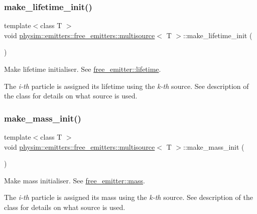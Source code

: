 \subsubsection{\texorpdfstring{make\+\_\+lifetime\+\_\+init()}{make\_lifetime\_init()}}
{\footnotesize\ttfamily template$<$class T $>$ \\
void \hyperlink{classphysim_1_1emitters_1_1free__emitters_1_1multisource}{physim\+::emitters\+::free\+\_\+emitters\+::multisource}$<$ T $>$\+::make\+\_\+lifetime\+\_\+init (\begin{DoxyParamCaption}{ }\end{DoxyParamCaption})}



Make lifetime initialiser. See \hyperlink{classphysim_1_1emitters_1_1free__emitter_a596108fe3602299fa9035ece668653d4}{free\+\_\+emitter\+::lifetime}. 

The {\itshape i-\/th} particle is assigned its lifetime using the {\itshape k-\/th} source. See description of the class for details on what source is used. \mbox{\label{classphysim_1_1emitters_1_1free__emitters_1_1multisource_aecd70362b2df41276206a600c55a78a8}} 
\subsubsection{\texorpdfstring{make\+\_\+mass\+\_\+init()}{make\_mass\_init()}}
{\footnotesize\ttfamily template$<$class T $>$ \\
void \hyperlink{classphysim_1_1emitters_1_1free__emitters_1_1multisource}{physim\+::emitters\+::free\+\_\+emitters\+::multisource}$<$ T $>$\+::make\+\_\+mass\+\_\+init (\begin{DoxyParamCaption}{ }\end{DoxyParamCaption})}



Make mass initialiser. See \hyperlink{classphysim_1_1emitters_1_1base__emitter_a4e1b65730afef86899544d3306f7547d}{free\+\_\+emitter\+::mass}. 

The {\itshape i-\/th} particle is assigned its mass using the {\itshape k-\/th} source. See description of the class for details on what source is used. \mbox{\label{classphysim_1_1emitters_1_1free__emitters_1_1multisource_a733668bafd378a28fb4c83228f66da9f}} 
